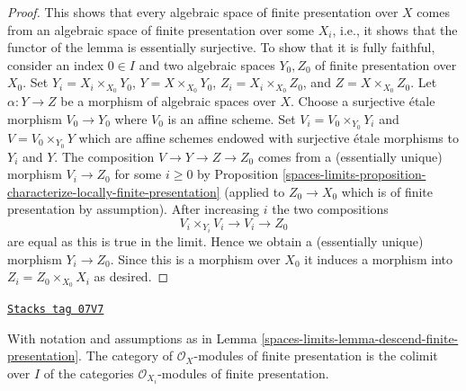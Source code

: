 \begin{proof}
\medskip\noindent
This shows that every algebraic space of finite presentation over $X$ comes
from an algebraic space of finite presentation over some $X_i$, i.e.,
it shows that the functor of the lemma is essentially surjective. To
show that it is fully faithful, consider an index $0 \in I$ and two
algebraic spaces $Y_0, Z_0$ of finite presentation over $X_0$.
Set $Y_i = X_i \times_{X_0} Y_0$, $Y = X \times_{X_0} Y_0$,
$Z_i = X_i \times_{X_0} Z_0$, and $Z = X \times_{X_0} Z_0$. Let
$\alpha : Y \to Z$ be a morphism of algebraic spaces over $X$.
Choose a surjective \'etale morphism $V_0 \to Y_0$ where $V_0$ is
an affine scheme. Set $V_i = V_0 \times_{Y_0} Y_i$ and
$V = V_0 \times_{Y_0} Y$ which are affine schemes endowed with
surjective \'etale morphisms to $Y_i$ and $Y$. The composition
$V \to Y \to Z \to Z_0$ comes from a (essentially unique) morphism
$V_i \to Z_0$ for some $i \geq 0$ by
Proposition \ref{spaces-limits-proposition-characterize-locally-finite-presentation}
(applied to $Z_0 \to X_0$ which is of finite presentation by assumption).
After increasing $i$ the two compositions
$$
V_i \times_{Y_i} V_i \to V_i \to Z_0
$$
are equal as this is true in the limit. Hence we obtain a (essentially unique)
morphism $Y_i \to Z_0$. Since this is a morphism over $X_0$
it induces a morphism into $Z_i = Z_0 \times_{X_0} X_i$ as desired.
\end{proof}

\begin{lemma}
\label{spaces-limits-lemma-descend-modules-finite-presentation}
\href{https://stacks.math.columbia.edu/tag/07V7}{\texttt{Stacks tag 07V7}}

With notation and assumptions as in
Lemma \ref{spaces-limits-lemma-descend-finite-presentation}.
The category of $\mathcal{O}_X$-modules of finite presentation is the
colimit over $I$ of the categories $\mathcal{O}_{X_i}$-modules of finite
presentation.
\end{lemma}

